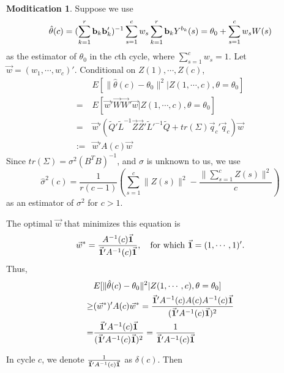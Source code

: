 \documentclass{article}
\theoremstyle{plain}
\theoremstyle{definition}
\newtheorem{modification}{Moditication}
\begin{document}
\begin{modification}
Suppose we use 
\[
\hat{\theta}(c)=(\sum_{k=1}^{r}\bold{b}_k\bold{b}_k')^{-1}\sum_{s=1}^{c}w_s\sum_{k=1}^{r}\bold{b}_kY^{b_k}(s)=\theta_0+\sum_{s=1}^{c}w_s W(s)
\]
as the estimator of $\theta_0$ in the $c$th cycle, where $\sum_{s=1}^{c}w_s=1$. Let $\vec{w}=(w_1,\cdots,w_c)'$. Conditional on $Z(1),\cdots,Z(c)$, 
\begin{align*}
&E[\|\hat{\theta}(c)-\theta_0\|^2|Z(1,\cdots,c),\theta=\theta_0]\\
=&E[\vec{w}'\vec{W}\vec{W}'\vec{w}|Z(1,\cdots,c),\theta=\theta_0]\\
=& \vec{w}'\left(\tilde{Q}'\tilde{L}^{-1}\vec{Z}\vec{Z}'\tilde{L}'^{-1}\tilde{Q} + tr(\Sigma)\vec{q}_c'\vec{q}_c\right)\vec{w}\\
:=&\vec{w}' A(c) \vec{w}
\end{align*}
Since $tr(\Sigma)=\sigma^2(B^TB)^{-1}$, and $\sigma$ is unknown to us, we use 
\[\hat{\sigma}^2(c)=\frac{1}{r(c-1)}\left(\sum_{s=1}^{c}\|Z(s)\|^2-\frac{\|\sum_{s=1}^{c}Z(s)\|^2}{c}\right)\]
as an estimator of $\sigma^2$ for $c>1$.

The optimal $\vec{w}$ that minimizes this equation is 
\[\vec{w}^*=\frac{A^{-1}(c)\vec{\bold{1}}}{\vec{\bold{1}}'A^{-1}(c)\vec{\bold{1}}},\quad \text{for which }\vec{\bold{1}}=(1,\cdots,1)'.\]
Thus,
\begin{align*}
&E[\|\hat{\theta}(c)-\theta_0\|^2|Z(1,\cdots,c),\theta=\theta_0]\\
\geq & (\vec{w}^*)'A(c)\vec{w}^*
=\frac{\vec{\bold{1}}'A^{-1}(c)A(c)A^{-1}(c)\vec{\bold{1}}}{(\vec{\bold{1}}'A^{-1}(c)\vec{\bold{1}})^2}\\
=&\frac{\vec{\bold{1}}'A^{-1}(c)\vec{\bold{1}}}{(\vec{\bold{1}}'A^{-1}(c)\vec{\bold{1}})^2}=\frac{1}{\vec{\bold{1}}'A^{-1}(c)\vec{\bold{1}}}
\end{align*}

In cycle $c$, we denote $\frac{1}{\vec{\bold{1}}'A^{-1}(c)\vec{\bold{1}}}$ as $\delta(c)$. Then 






\end{modification}
\end{document}
